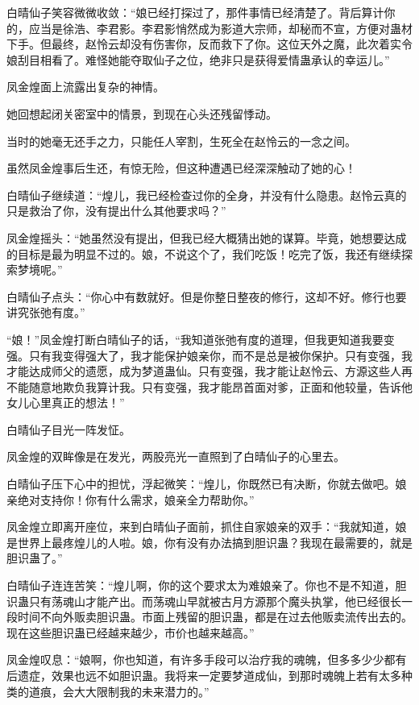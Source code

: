 \begin{this_body}
白晴仙子笑容微微收敛：“娘已经打探过了，那件事情已经清楚了。背后算计你的，应当是徐浩、李君影。李君影悄然成为影道大宗师，却秘而不宣，方便对蛊材下手。但最终，赵怜云却没有伤害你，反而救下了你。这位天外之魔，此次着实令娘刮目相看了。难怪她能夺取仙子之位，绝非只是获得爱情蛊承认的幸运儿。”

凤金煌面上流露出复杂的神情。

她回想起闭关密室中的情景，到现在心头还残留悸动。

当时的她毫无还手之力，只能任人宰割，生死全在赵怜云的一念之间。

虽然凤金煌事后生还，有惊无险，但这种遭遇已经深深触动了她的心！

白晴仙子继续道：“煌儿，我已经检查过你的全身，并没有什么隐患。赵怜云真的只是救治了你，没有提出什么其他要求吗？”

凤金煌摇头：“她虽然没有提出，但我已经大概猜出她的谋算。毕竟，她想要达成的目标是最为明显不过的。娘，不说这个了，我们吃饭！吃完了饭，我还有继续探索梦境呢。”

白晴仙子点头：“你心中有数就好。但是你整日整夜的修行，这却不好。修行也要讲究张弛有度。”

“娘！”凤金煌打断白晴仙子的话，“我知道张弛有度的道理，但我更知道我要变强。只有我变得强大了，我才能保护娘亲你，而不是总是被你保护。只有变强，我才能达成师父的遗愿，成为梦道蛊仙。只有变强，我才能让赵怜云、方源这些人再不能随意地欺负我算计我。只有变强，我才能昂首面对爹，正面和他较量，告诉他女儿心里真正的想法！”

白晴仙子目光一阵发怔。

凤金煌的双眸像是在发光，两股亮光一直照到了白晴仙子的心里去。

白晴仙子压下心中的担忧，浮起微笑：“煌儿，你既然已有决断，你就去做吧。娘亲绝对支持你！你有什么需求，娘亲全力帮助你。”

凤金煌立即离开座位，来到白晴仙子面前，抓住自家娘亲的双手：“我就知道，娘是世界上最疼煌儿的人啦。娘，你有没有办法搞到胆识蛊？我现在最需要的，就是胆识蛊了。”

白晴仙子连连苦笑：“煌儿啊，你的这个要求太为难娘亲了。你也不是不知道，胆识蛊只有荡魂山才能产出。而荡魂山早就被古月方源那个魔头执掌，他已经很长一段时间不向外贩卖胆识蛊。市面上残留的胆识蛊，都是在过去他贩卖流传出去的。现在这些胆识蛊已经越来越少，市价也越来越高。”

凤金煌叹息：“娘啊，你也知道，有许多手段可以治疗我的魂魄，但多多少少都有后遗症，效果也远不如胆识蛊。我将来一定要梦道成仙，到那时魂魄上若有太多种类的道痕，会大大限制我的未来潜力的。”


\end{this_body}

